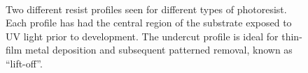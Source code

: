 \documentclass[
  a4paper,
]{scrbook}
\begin{document}
\begin{figure}

\begin{minipage}[t]{0.47\linewidth}

{\centering 


}

\end{minipage}%
%
\begin{minipage}[t]{0.05\linewidth}

{\centering 

~

}

\end{minipage}%
%
\begin{minipage}[t]{0.47\linewidth}

{\centering 


}

\end{minipage}%

\caption{\label{fig-photolithography-profiles}Two different resist
profiles seen for different types of photoresist. Each profile has had
the central region of the substrate exposed to UV light prior to
development. The undercut profile is ideal for thin-film metal
deposition and subsequent patterned removal, known as ``lift-off''.}

\end{figure}
\end{document}
